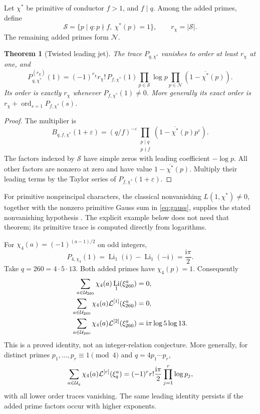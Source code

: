 \documentclass[11pt]{article}
\numberwithin{equation}{section}
\newtheorem{theorem}{Theorem}[section]
\theoremstyle{definition}\newtheorem{definition}[theorem]{Definition}
\theoremstyle{remark}\newtheorem{remark}[theorem]{Remark}
\DeclareMathOperator{\Li}{Li}
\DeclareMathOperator{\ord}{ord}
\newcommand{\ii}{\mathrm i}
\newcommand{\eps}{\varepsilon}
\newcommand{\ch}{\chi^*}
\newcommand{\bch}{\overline{\chi^*}}
\newcommand{\Liord}[2]{\mathcal L^{[#1]}(#2)}
\begin{document}
Let $\ch$ be primitive of conductor $f>1$, and $f\mid q$.
Among the added primes, define
\[
\mathcal S=\{p\mid q:p\nmid f,\ \ch(p)=1\},\qquad r_\chi=|\mathcal S|.
\]
The remaining added primes form $\mathcal N$.

\begin{theorem}[Twisted leading jet]\label{thm:twisted}
The trace $P_{q,\ch}$ vanishes to order at least $r_\chi$ at one, and
\begin{equation}\label{eq:twistedlead}
P_{q,\ch}^{(r_\chi)}(1)=
(-1)^{r_\chi}r_\chi!\,
P_{f,\ch}(1)
\prod_{p\in\mathcal S}\log p
\prod_{p\in\mathcal N}(1-\bch(p)).
\end{equation}
Its order is exactly $r_\chi$ whenever $P_{f,\ch}(1)\ne0$.
More generally its exact order is $r_\chi+\ord_{s=1}P_{f,\ch}(s)$.
\end{theorem}
\begin{proof}
The multiplier is
\[
B_{q,f,\ch}(1+\eps)=
(q/f)^{-\eps}
\prod_{\substack{p\mid q\\p\nmid f}}(1-\bch(p)p^\eps).
\]
The factors indexed by $\mathcal S$ have simple zeros with leading
coefficient $-\log p$. All other factors are nonzero at zero and have
value $1-\bch(p)$. Multiply their leading terms by the Taylor series
of $P_{f,\ch}(1+\eps)$.
\end{proof}

For primitive nonprincipal characters, the classical nonvanishing
$L(1,\ch)\ne0$, together with the nonzero primitive Gauss sum in
\eqref{eq:gauss}, supplies the stated nonvanishing hypothesis
\cite{dlmfdirichlet}. The explicit example below does not need that theorem;
its primitive trace is computed directly from logarithms.

For $\chi_4(a)=(-1)^{(a-1)/2}$ on odd integers,
\[
P_{4,\chi_4}(1)=\Li_1(\ii)-\Li_1(-\ii)=\frac{\ii\pi}{2}.
\]
Take $q=260=4\cdot5\cdot13$. Both added primes have $\chi_4(p)=1$.
Consequently
\begin{align}\label{eq:260}
\sum_{a\in\U_{260}}\chi_4(a)\Li_1(\xi_{260}^a)&=0,\\
\sum_{a\in\U_{260}}\chi_4(a)\Liord{1}{\xi_{260}^a}&=0,\\
\sum_{a\in\U_{260}}\chi_4(a)\Liord{2}{\xi_{260}^a}
&=\ii\pi\log5\log13.
\end{align}
This is a proved identity, not an integer-relation conjecture. More generally,
for distinct primes $p_1,\ldots,p_r\equiv1\pmod4$ and
$q=4p_1\cdots p_r$,
\begin{equation}\label{eq:chi4family}
\sum_{a\in\U_q}\chi_4(a)\Liord{r}{\xi_q^a}
=(-1)^r r!\frac{\ii\pi}{2}\prod_{j=1}^r\log p_j,
\end{equation}
with all lower order traces vanishing. The same leading identity persists
if the added prime factors occur with higher exponents.
\end{document}
